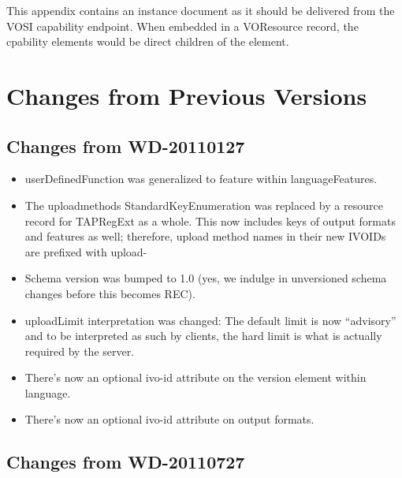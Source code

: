 \documentclass{ivoa}
\begin{document}
This appendix contains an instance document as it should be 
delivered from the VOSI capability endpoint. When embedded in a
VOResource record, the cpability elements would be direct children of
the  element.




\section{Changes from Previous Versions}

\label{changes}


\subsection{Changes from WD-20110127}

\label{changes-20110127}

\begin{itemize}

\item userDefinedFunction was generalized to feature within languageFeatures.{}

\item The uploadmethods StandardKeyEnumeration was replaced by a
resource record for TAPRegExt as a whole.  This now includes keys of output
formats and features as well; therefore, upload method names in their new
IVOIDs are prefixed with upload-{}

\item Schema version was bumped to 1.0 (yes, we indulge in unversioned
schema changes before this becomes REC).{}

\item uploadLimit interpretation was changed: The default limit is now
``advisory'' and to be interpreted as such by clients, the hard limit
is what is actually required by the server.{}

\item There's now an optional ivo-id attribute on the version element
within language.{}

\item There's now an optional ivo-id attribute on output formats.{}

\end{itemize}

\subsection{Changes from WD-20110727}
\end{document}
